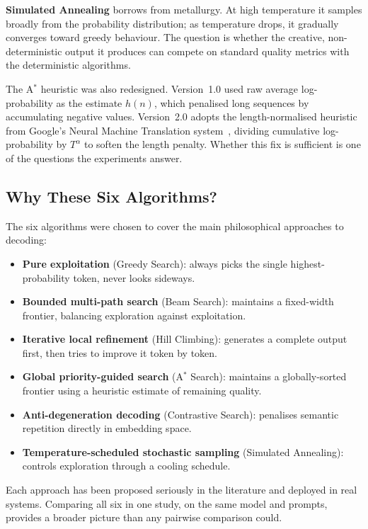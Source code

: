 \documentclass[12pt]{article}
\begin{document}
	\textbf{Simulated Annealing} borrows from metallurgy. At high temperature it samples broadly from the probability distribution; as temperature drops, it gradually converges toward greedy behaviour. The question is whether the creative, non-deterministic output it produces can compete on standard quality metrics with the deterministic algorithms.
	
	The A$^*$ heuristic was also redesigned. Version~1.0 used raw average log-probability as the estimate $h(n)$, which penalised long sequences by accumulating negative values. Version~2.0 adopts the length-normalised heuristic from Google's Neural Machine Translation system~\cite{wu2016gnmt}, dividing cumulative log-probability by $T^\alpha$ to soften the length penalty. Whether this fix is sufficient is one of the questions the experiments answer.
	
	\subsection{Why These Six Algorithms?}
	
	The six algorithms were chosen to cover the main philosophical approaches to decoding:
	
	\begin{itemize}[leftmargin=*]
		\item \textbf{Pure exploitation} (Greedy Search): always picks the single highest-probability token, never looks sideways.
		\item \textbf{Bounded multi-path search} (Beam Search): maintains a fixed-width frontier, balancing exploration against exploitation.
		\item \textbf{Iterative local refinement} (Hill Climbing): generates a complete output first, then tries to improve it token by token.
		\item \textbf{Global priority-guided search} (A$^*$ Search): maintains a globally-sorted frontier using a heuristic estimate of remaining quality.
		\item \textbf{Anti-degeneration decoding} (Contrastive Search): penalises semantic repetition directly in embedding space.
		\item \textbf{Temperature-scheduled stochastic sampling} (Simulated Annealing): controls exploration through a cooling schedule.
	\end{itemize}
	
	Each approach has been proposed seriously in the literature and deployed in real systems. Comparing all six in one study, on the same model and prompts, provides a broader picture than any pairwise comparison could.
	
\end{document}
